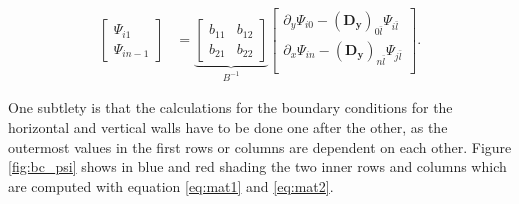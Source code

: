 \begin{align}
\begin{bmatrix} \Psi_{i1} \\ \Psi_{in-1}
\end{bmatrix} &=
\underbrace{\begin{bmatrix} b_{11} & b_{12} \\ b_{21} & b_{22} 
\end{bmatrix}}_{B^{-1}}
\begin{bmatrix}
\partial_y\Psi_{i0} - (\mathbf{D_y})_{0\bar{l}}\Psi_{i\bar{l}} \\
\partial_x\Psi_{in} - (\mathbf{D_y})_{n\bar{l}}\Psi_{j\bar{l}} \\
\end{bmatrix}.
\label{eq:mat2}
\end{align}

One subtlety is that the calculations for the boundary conditions for the
horizontal and vertical walls have to be done one after the other, as the
outermost values in the first rows or columns are dependent on each other.
Figure \ref{fig:bc_psi} shows in blue and red shading the two inner rows and
columns which are computed with equation \eqref{eq:mat1} and \eqref{eq:mat2}.

